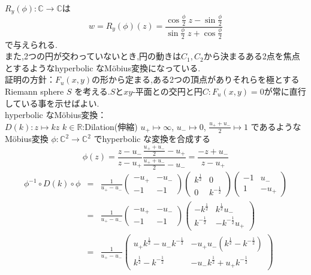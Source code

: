 \documentclass[a4j,12pt]{jarticle}
\numberwithin{equation}{section}
\newcommand{\C}{\mathbb C}
\begin{document}
$R_{y}(\phi) : \mathbb{C} \rightarrow \mathbb{C}$は
\begin{equation}
\label{}
w = R_{y}(\phi)(z) = \frac{\cos{\frac{\phi}{2}} \; z -\sin{\frac{\phi}{2}}}{\sin{\frac{\phi}{2}} \; z+ \cos{\frac{\phi}{2}}}
\end{equation}
で与えられる.\\
また,2つの円が交わっていないとき,円の動きは$C_1,C_2$から決まるある2点を焦点とするようなhyperbolic なM\"obius変換になっている.\\
証明の方針：$F_u(x,y)$の形から定まる,ある2つの頂点がありそれらを極とするRiemann sphere $S$ を考える.$S$と$xy$-平面との交円と円$C:F_u(x,y)=0$が常に直行している事を示せばよい.\\
hyperbolic なM\"obius変換：\\
$D(k):z \mapsto kz$ $k\in \mathbb{R}$:Dilation(伸縮)
$u_+ \mapsto \infty$, $u_- \mapsto 0$, $\frac{u_+ + u_-}{2} \mapsto 1$ であるような M\"obius変換 $\phi:\C^2 \rightarrow \C^2$ でhyperbolic な変換を合成する
\begin{equation}
  \phi(z) = \frac{z - u_-}{z - u_+} \frac{\frac{u_+ + u_-}{2} - u_+}{\frac{u_+ + u_-}{2} - u_-} = \frac{-z + u_-}{z - u_+}
\end{equation}
\begin{eqnarray}
  \phi^{-1} \circ D(k) \circ \phi & = &
  \frac{1}{u_+ - u_-}
  \left(\begin{array}{cc} -u_+ & -u_- \\ -1 & -1 \end{array}\right)  
  \left(\begin{array}{cc}k^{\frac{1}{2}} & 0 \\0 & k^{-\frac{1}{2}}\end{array}\right) 
  \left(\begin{array}{cc} -1 & u_- \\ 1 & -u_+ \end{array}\right) \nonumber\\
  & = &
  \frac{1}{u_+ - u_-}
  \left(\begin{array}{cc} -u_+ & -u_- \\ -1 & -1 \end{array}\right)  
  \left(\begin{array}{cc}-k^{\frac{1}{2}} &  k^{\frac{1}{2}}u_- \\  k^{-\frac{1}{2}} & -k^{-\frac{1}{2}} u_+\end{array}\right)  \nonumber\\
  & = &
  \frac{1}{u_+ - u_-}
  \left(\begin{array}{cc}u_+k^{\frac{1}{2}} -  u_-k^{-\frac{1}{2}} & -u_+u_-(k^{\frac{1}{2}} -  k^{-\frac{1}{2}}) \\ k^{\frac{1}{2}} -  k^{-\frac{1}{2}} & -u_-k^{\frac{1}{2}} +  u_+k^{-\frac{1}{2}} \end{array}\right)  \nonumber\\
\end{eqnarray}
\end{document}
